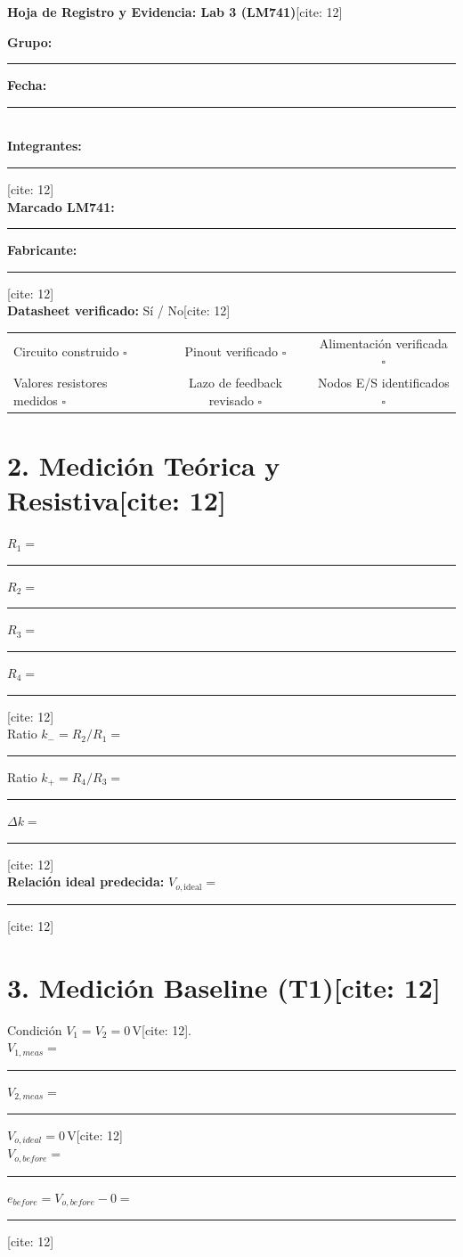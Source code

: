 \documentclass[11pt, a4paper]{article}
\begin{document}
\begin{center}
    \Large\textbf{\textcolor{ucbblue}{Hoja de Registro y Evidencia: Lab 3 (LM741)}}[cite: 12]
\end{center}

\textbf{Grupo:} \rule{4cm}{0.4pt} \hfill \textbf{Fecha:} \rule{3cm}{0.4pt} \\
\textbf{Integrantes:} \rule{10cm}{0.4pt}[cite: 12] \\
\textbf{Marcado LM741:} \rule{4cm}{0.4pt} \textbf{Fabricante:} \rule{4cm}{0.4pt}[cite: 12] \\
\textbf{Datasheet verificado:} Sí / No[cite: 12]

\vspace{0.3cm}
\begin{tcolorbox}[colback=white, colframe=black, title=\textbf{1. Readiness Gate (Validación Previa)[cite: 12]}]
    \begin{tabularx}{\textwidth}{X c c}
    Circuito construido $\square$ & Pinout verificado $\square$ & Alimentación verificada $\square$ \\
    Valores resistores medidos $\square$ & Lazo de feedback revisado $\square$ & Nodos E/S identificados $\square$
    \end{tabularx}
\end{tcolorbox}

\section*{2. Medición Teórica y Resistiva[cite: 12]}
$R_1 =$ \rule{2cm}{0.4pt} $R_2 =$ \rule{2cm}{0.4pt} $R_3 =$ \rule{2cm}{0.4pt} $R_4 =$ \rule{2cm}{0.4pt}[cite: 12] \\
Ratio $k_- = R_2/R_1 =$ \rule{2cm}{0.4pt} \quad Ratio $k_+ = R_4/R_3 =$ \rule{2cm}{0.4pt} \quad $\Delta k =$ \rule{2cm}{0.4pt}[cite: 12] \\
\textbf{Relación ideal predecida:} $V_{o,\mathrm{ideal}} =$ \rule{6cm}{0.4pt}[cite: 12]

\section*{3. Medición Baseline (T1)[cite: 12]}
Condición $V_1 = V_2 = 0\,\text{V}$[cite: 12]. \\
$V_{1,meas} =$ \rule{2cm}{0.4pt} \quad $V_{2,meas} =$ \rule{2cm}{0.4pt} \quad $V_{o,ideal} = 0\,\text{V}$[cite: 12] \\
$V_{o,before} =$ \rule{2cm}{0.4pt} \quad $e_{before} = V_{o,before} - 0 =$ \rule{2cm}{0.4pt}[cite: 12]
\end{document}
